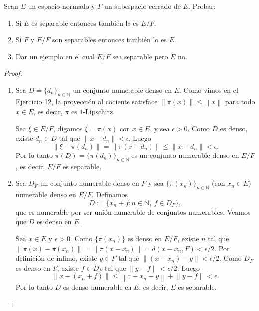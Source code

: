 \documentclass{article}
\theoremstyle{definition}
\newcommand{\N}{\mathbb{N}}
\newcommand{\norm}[1]{\left\lVert #1 \right\rVert}       %
\newenvironment{ejercicio}[1]{\begin{trivlist}
\item[\hskip \labelsep {\bfseries Ejercicio}\hskip \labelsep {\bfseries #1.}]}{\end{trivlist}}
\begin{document}
\vspace{0.5cm}

\begin{ejercicio}{13}
    Sean \(E\) un espacio normado y \(F\) un subespacio cerrado de \(E\). Probar:
    \begin{enumerate}
        \item Si \(E\) es separable entonces también lo es \(E/F\).
        \item Si \(F\) y \(E/F\) son separables entonces también lo es \(E\).
        \item Dar un ejemplo en el cual \(E/F\) sea separable pero \(E\) no.
    \end{enumerate}
\end{ejercicio}
\begin{proof}
    \begin{enumerate}
        \item Sea \( D = {\{d_n\}}_{n\in\N} \) un conjunto numerable denso en \(E\). Como vimos en el Ejercicio 12, la proyección al cociente satisface \( \norm{\pi(x)} \leq \norm{x} \) para todo \( x \in E \), es decir, \( \pi \) es \(1\)-Lipschitz.

              Sea \( \xi \in E/F \), digamos \( \xi = \pi(x) \) con \( x \in E \), y sea \( \epsilon > 0 \). Como \(D\) es denso, existe \( d_n \in D \) tal que \( \norm{x - d_n} < \epsilon \). Luego
              \[
                  \norm{\xi - \pi(d_n)} = \norm{\pi(x - d_n)} \leq \norm{x-d_n} < \epsilon.
              \]
              Por lo tanto \( \pi(D) = {\{\pi(d_n)\}}_{n\in\N} \) es un conjunto numerable denso en \(E/F\), es decir, \(E/F\) es separable.

        \item Sea \( D_F \) un conjunto numerable denso en \(F\) y sea \( {\{\pi(x_n)\}}_{n\in\N} \) (con \( x_n \in E \)) numerable denso en \(E/F\). Definamos
              \[
                  D := \{ x_n + f : n \in \N,\ f \in D_F \},
              \]
              que es numerable por ser unión numerable de conjuntos numerables. Veamos que \(D\) es denso en \(E\).

              Sea \( x \in E \) y \( \epsilon > 0 \). Como \( {\{\pi(x_n)\}} \) es denso en \(E/F\), existe \(n\) tal que \( \norm{\pi(x) - \pi(x_n)} = \norm{\pi(x-x_n)} = d(x - x_n, F) < \epsilon/2 \). Por definición de ínfimo, existe \( y \in F \) tal que \( \norm{(x - x_n) - y} < \epsilon/2 \). Como \(D_F\) es denso en \(F\), existe \( f \in D_F \) tal que \( \norm{y - f} < \epsilon/2 \). Luego
              \[
                  \norm{x - (x_n + f)} \leq \norm{x - x_n - y} + \norm{y - f} < \epsilon.
              \]
              Por lo tanto \(D\) es denso numerable en \(E\), es decir, \(E\) es separable.


\end{enumerate}
\end{proof}
\end{document}
